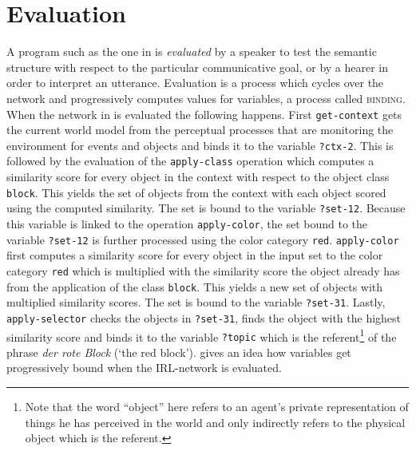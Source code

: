 \section{Evaluation}
A program such as the one in  is \emph{evaluated}
by a speaker to test the semantic structure with respect to the 
particular communicative goal, or by a hearer in order to interpret an utterance.
Evaluation is a process which cycles over the network and progressively computes values
for variables, a process called \textsc{binding}.
When the network in 
is evaluated the following happens. First {\footnotesize\tt get-context} gets the current 
world model from the perceptual processes that are monitoring the 
environment for events and objects and binds it to the variable 
{\footnotesize\tt ?ctx-2}. This is followed by the evaluation of the {\footnotesize\tt apply-class}
operation which computes a similarity score for every object
in the context with respect to the object class {\footnotesize\tt block}. 
This yields the set of objects from the context with each object 
scored using the computed similarity. The set is bound to the variable {\footnotesize\tt ?set-12}. 
Because this variable is linked to the operation {\footnotesize\tt apply-color}, 
the set bound to the variable {\footnotesize\tt ?set-12} is further processed using the 
color category {\footnotesize\tt red}. {\footnotesize\tt apply-color} first computes
a similarity score for every object in the input set to the color category 
{\footnotesize\tt red} which is multiplied with the similarity score the object
already has from the application of the class {\footnotesize\tt block}.
This yields a new set of objects with multiplied similarity scores.
The set is bound to the variable {\footnotesize\tt ?set-31}. Lastly, {\footnotesize\tt apply-selector} 
checks the objects in {\footnotesize\tt ?set-31}, finds the object with 
the highest similarity score and binds it to the variable {\footnotesize\tt ?topic}
which is the referent\footnote{Note that the word ``object'' here refers 
to an agent's private representation of 
things he has perceived in the world and only 
indirectly refers to the physical object which is the referent.
} of the phrase \textit{der rote Block} (`the red block').
 gives an idea how variables get progressively 
bound when the IRL-network is evaluated.

